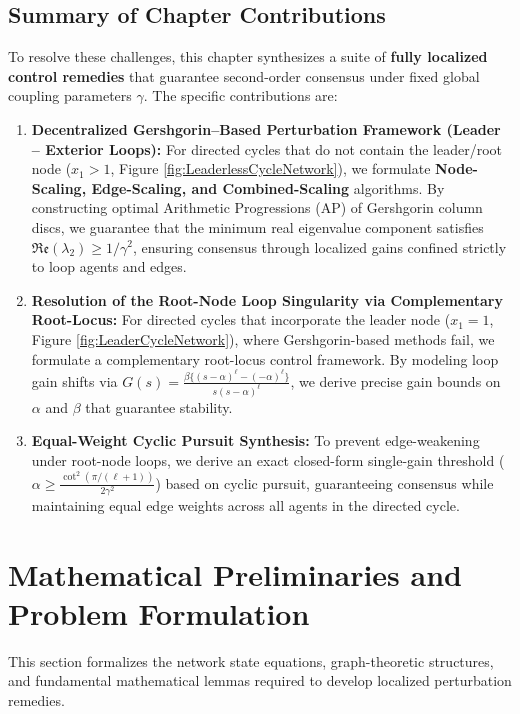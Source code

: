 \subsection*{Summary of Chapter Contributions}
To resolve these challenges, this chapter synthesizes a suite of \textbf{fully localized control remedies} that guarantee second-order consensus under fixed global coupling parameters $\gamma$. The specific contributions are:
\begin{enumerate}
    \item \textbf{Decentralized Gershgorin--Based Perturbation Framework (Leader -- Exterior Loops):} For directed cycles that do not contain the leader/root node ($x_1 > 1$, Figure \ref{fig:LeaderlessCycleNetwork}), we formulate \textbf{Node-Scaling, Edge-Scaling, and Combined-Scaling} algorithms. By constructing optimal Arithmetic Progressions (AP) of Gershgorin column discs, we guarantee that the minimum real eigenvalue component satisfies $\mathfrak{Re}(\lambda_2) \ge 1/\gamma^2$, ensuring consensus through localized gains confined strictly to loop agents and edges.
    \item \textbf{Resolution of the Root-Node Loop Singularity via Complementary Root-Locus:} For directed cycles that incorporate the leader node ($x_1 = 1$, Figure \ref{fig:LeaderCycleNetwork}), where Gershgorin-based methods fail, we formulate a complementary root-locus control framework. By modeling loop gain shifts via $G(s) = \frac{\beta\{(s-\alpha)^\ell - (-\alpha)^\ell\}}{s(s-\alpha)^\ell}$, we derive precise gain bounds on $\alpha$ and $\beta$ that guarantee stability.
    \item \textbf{Equal-Weight Cyclic Pursuit Synthesis:} To prevent edge-weakening under root-node loops, we derive an exact closed-form single-gain threshold ($\alpha \ge \frac{\cot^2(\pi/(\ell+1))}{2\gamma^2}$) based on cyclic pursuit, guaranteeing consensus while maintaining equal edge weights across all agents in the directed cycle.
\end{enumerate}
\section{Mathematical Preliminaries and Problem Formulation} \label{sec:ch_GC_prelims}
This section formalizes the network state equations, graph-theoretic structures, and fundamental mathematical lemmas required to develop localized perturbation remedies.
